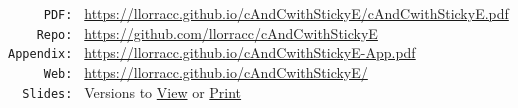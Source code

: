     \parbox{\textwidth}{
      \begin{center}
        \begin{tabbing}
          \texttt{~~~~~PDF:~} \= \= \url{https://llorracc.github.io/cAndCwithStickyE/cAndCwithStickyE.pdf} \\ %
          \texttt{~~~~Repo:~} \= \= \url{https://github.com/llorracc/cAndCwithStickyE}  \\
          \texttt{Appendix:~} \> \> \url{https://llorracc.github.io/cAndCwithStickyE-App.pdf} \\
          \texttt{~~~~~Web:~} \> \> \url{https://llorracc.github.io/cAndCwithStickyE/} \\
          \texttt{~~Slides:~} \> \> Versions to \href{https://llorracc.github.io/cAndCwithStickyE/cAndCwithStickyE-Slides.pdf}{View} or \href{https://llorracc.github.io/cAndCwithStickyE/cAndCwithStickyE-Slides-Print.pdf}{Print} \\
        \end{tabbing}
      \end{center}
    }

